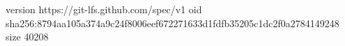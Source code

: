 version https://git-lfs.github.com/spec/v1
oid sha256:8794aa105a374a9c24f8006eef672271633d1fdfb35205c1dc2f0a2784149248
size 40208
